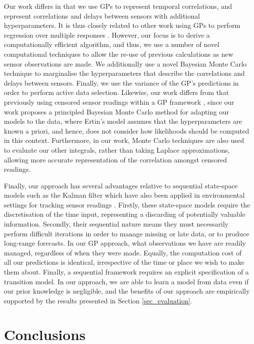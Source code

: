 \documentclass{acmtrans2m}
\begin{document}
Our work differs in that we use GPs to represent temporal correlations, and represent correlations and delays between sensors with additional hyperparameters. It is thus closely related to other work using GPs to perform regression over multiple responses \cite{dep_GP,latent_factor}. However, our focus is to derive a computationally efficient algorithm, and thus, we use a number of novel computational techniques to allow the re-use of previous calculations as new sensor observations are made. We additionally use a novel Bayesian Monte Carlo technique to marginalise the hyperparameters that describe the correlations and delays between sensors. Finally, we use the variance of the GP's predictions in order to perform active data selection. Likewise, our work differs from that previously using censored sensor readings within a GP framework \cite{ertin2007gpm}, since our work proposes a principled Bayesian Monte Carlo method for adapting our models to the data, where Ertin's model assumes that the hyperparameters are known a priori, and hence, does not consider how likelihoods should be computed in this context. Furthermore, in our work, Monte Carlo techniques are also used to evaluate our other integrals, rather than taking Laplace approximations, allowing more accurate representation of the correlation amongst censored readings. 

Finally, our approach has several advantages relative to sequential state-space models such as the Kalman filter \cite{Girard,Jazwinski} which have also been applied in environmental settings for tracking sensor readings \cite{kalman_oceanography}. Firstly, these state-space models require the discretisation of the time input, representing a discarding of potentially valuable information. Secondly, their sequential nature means they must necessarily perform difficult iterations in order to manage missing or late data, or to produce long-range forecasts. In our GP approach, what observations we have are readily managed, regardless of when they were made. Equally, the computation cost of all our predictions is identical, irrespective of the time or place we wish to make them about. Finally, a sequential framework requires an explicit specification of a transition model. In our approach, we are able to learn a model from data even if our prior knowledge is negligible, and the benefits of our approach are empirically supported by the results presented in Section \ref{sec_evaluation}.

\section{Conclusions}\label{sec_conclusion}
\end{document}

